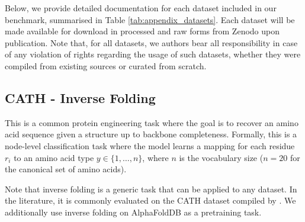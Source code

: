 
Below, we provide detailed documentation for each dataset included in our benchmark, summarised in Table \ref{tab:appendix_datasets}. 
Each dataset will be made available for download in processed and raw forms from Zenodo upon publication. 
Note that, for all datasets, we authors bear all responsibility in case of any violation of rights regarding the usage of such datasets, whether they were compiled from existing sources or curated from scratch.

\subsection{CATH - Inverse Folding}

This is a common protein engineering task where the goal is to recover an amino acid sequence given a structure up to backbone completeness. Formally, this is a node-level classification task where the model learns a mapping for each residue $r_i$ to an amino acid type $y \in \{1, \dots, n \}$, where $n$ is the vocabulary size ($n=20$ for the canonical set of amino acids).

Note that inverse folding is a generic task that can be applied to any dataset. In the literature, it is commonly evaluated on the CATH dataset compiled by \citet{NEURIPS2019_f3a4ff48}.
We additionally use inverse folding on AlphaFoldDB as a pretraining task.

